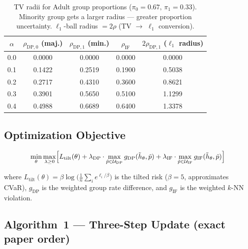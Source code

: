 \documentclass[11pt,a4paper]{article}
\newcommand{\calU}{\mathcal{U}}
\newcommand{\htilde}{\tilde{h}}
\newcommand{\ptilde}{\tilde{p}}
\newcommand{\rDP}[1][]{\rho_{\mathrm{DP}#1}}
\newcommand{\rIF}{\rho_{\mathrm{IF}}}
\newcommand{\lDP}{\lambda_{\mathrm{DP}}}
\newcommand{\lIF}{\lambda_{\mathrm{IF}}}
\newcommand{\gDP}{g_{\mathrm{DP}}}
\newcommand{\gIF}{g_{\mathrm{IF}}}
\newcommand{\Ltilt}{L_{\mathrm{tilt}}}
\begin{document}
\begin{table}[h]
\centering\small
\caption{TV radii for Adult group proportions ($\pi_0=0.67,\,\pi_1=0.33$).
  Minority group gets a larger radius --- greater proportion uncertainty.
  $\ell_1$-ball radius $= 2\rho$ (TV $\to$ $\ell_1$ conversion).}
\label{tab:radii}
\begin{tabular}{ccccc}
\toprule
\rowcolor{hdrblue!90}
\color{white}$\alpha$ &
\color{white}$\rDP[{,0}]$ (maj.) &
\color{white}$\rDP[{,1}]$ (min.) &
\color{white}$\rIF$ &
\color{white}$2\rDP[{,1}]$ ($\ell_1$ radius) \\
\midrule
0.0 & 0.0000 & 0.0000 & 0.0000 & 0.0000 \\
0.1 & 0.1422 & 0.2519 & 0.1900 & 0.5038 \\
0.2 & 0.2717 & 0.4310 & 0.3600 & 0.8621 \\
0.3 & 0.3901 & 0.5650 & 0.5100 & 1.1299 \\
0.4 & 0.4988 & 0.6689 & 0.6400 & 1.3378 \\
\bottomrule
\end{tabular}
\end{table}

\subsection{Optimization Objective}

\begin{equation}
  \min_\theta \max_{\lambda\ge 0}\Bigl[
    \Ltilt(\theta)
    + \lDP\cdot\max_{\ptilde\in\calU_{\mathrm{DP}}}\gDP(\htilde_\theta,\ptilde)
    + \lIF\cdot\max_{\ptilde\in\calU_{\mathrm{IF}}}\gIF(\htilde_\theta,\ptilde)
  \Bigr]
  \label{eq:lagrangian}
\end{equation}

where $\Ltilt(\theta)=\beta\log\!\bigl(\tfrac{1}{n}\sum_i e^{\ell_i/\beta}\bigr)$
is the tilted risk ($\beta=5$, approximates CVaR), $\gDP$ is the
weighted group rate difference, and $\gIF$ is the weighted $k$-NN violation.

\subsection{Algorithm~1 --- Three-Step Update (exact paper order)}
\end{document}
